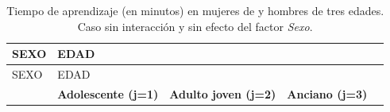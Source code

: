 \documentclass[]{book}
\theoremstyle{definition}
\theoremstyle{definition}
\theoremstyle{definition}
\theoremstyle{remark}
\begin{document}
\begin{longtable}[]{@{}lllll@{}}
\caption{\label{tab:aprendizaje1} Tiempo de aprendizaje (en minutos) en
mujeres de y hombres de tres edades. Caso sin interacción y sin efecto
del factor \emph{Sexo}.}\tabularnewline
\toprule
\begin{minipage}[b]{0.15\columnwidth}\raggedright
SEXO\strut
\end{minipage} & \begin{minipage}[b]{0.26\columnwidth}\raggedright
EDAD\strut
\end{minipage} & \begin{minipage}[b]{0.15\columnwidth}\raggedright
\strut
\end{minipage} & \begin{minipage}[b]{0.12\columnwidth}\raggedright
\strut
\end{minipage} & \begin{minipage}[b]{0.17\columnwidth}\raggedright
\strut
\end{minipage}\tabularnewline
\midrule
\endfirsthead
\toprule
\begin{minipage}[b]{0.15\columnwidth}\raggedright
SEXO\strut
\end{minipage} & \begin{minipage}[b]{0.26\columnwidth}\raggedright
EDAD\strut
\end{minipage} & \begin{minipage}[b]{0.15\columnwidth}\raggedright
\strut
\end{minipage} & \begin{minipage}[b]{0.12\columnwidth}\raggedright
\strut
\end{minipage} & \begin{minipage}[b]{0.17\columnwidth}\raggedright
\strut
\end{minipage}\tabularnewline
\midrule
\endhead
\begin{minipage}[t]{0.15\columnwidth}\raggedright
\strut
\end{minipage} & \begin{minipage}[t]{0.26\columnwidth}\raggedright
\textbf{Adolescente (j=1)}\strut
\end{minipage} & \begin{minipage}[t]{0.15\columnwidth}\raggedright
\textbf{Adulto joven (j=2)}\strut
\end{minipage} & \begin{minipage}[t]{0.12\columnwidth}\raggedright
\textbf{Anciano (j=3) }\strut
\end{minipage} & \begin{minipage}[t]{0.17\columnwidth}\raggedright

\end{minipage}
\end{longtable}
\end{document}

